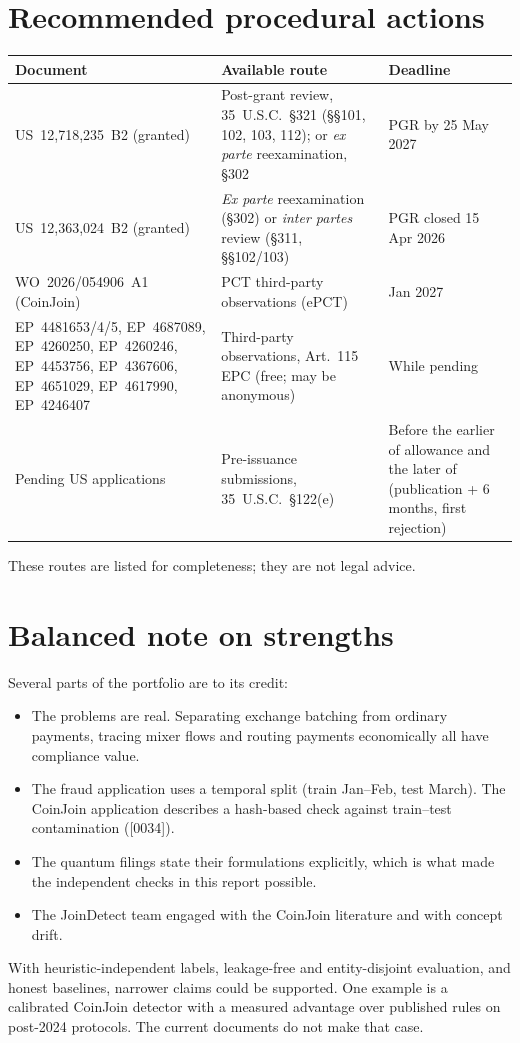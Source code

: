 \documentclass[10pt,a4paper]{article}
\begin{document}
\section{Recommended procedural actions}\label{sec:actions}
\begin{center}\small
\begin{tabularx}{\textwidth}{>{\raggedright\arraybackslash}p{4.2cm}>{\raggedright\arraybackslash}X>{\raggedright\arraybackslash}p{3.0cm}}
\toprule
Document & Available route & Deadline \\
\midrule
US~12,718,235~B2 (granted) & Post-grant review, 35~U.S.C.~\S321 (\S\S101, 102, 103, 112); or \emph{ex parte} reexamination, \S302 & PGR by 25 May 2027 \\
US~12,363,024~B2 (granted) & \emph{Ex parte} reexamination (\S302) or \emph{inter partes} review (\S311, \S\S102/103) & PGR closed 15 Apr 2026 \\
WO~2026/054906~A1 (CoinJoin) & PCT third-party observations (ePCT) & 4 Jan 2027 \\
EP~4481653/4/5, EP~4687089, EP~4260250, EP~4260246, EP~4453756, EP~4367606, EP~4651029, EP~4617990, EP~4246407 & Third-party observations, Art.~115 EPC (free; may be anonymous) & While pending \\
Pending US applications & Pre-issuance submissions, 35~U.S.C.~\S122(e) & Before the earlier of allowance and the later of (publication + 6 months, first rejection) \\
\bottomrule
\end{tabularx}
\end{center}
\noindent These routes are listed for completeness; they are not legal advice.

\section{Balanced note on strengths}
Several parts of the portfolio are to its credit:
\begin{itemize}
  \item The problems are real. Separating exchange batching from ordinary payments, tracing mixer flows and routing payments economically all have compliance value.
  \item The fraud application uses a temporal split (train Jan--Feb, test March). The CoinJoin application describes a hash-based check against train--test contamination ([0034]).
  \item The quantum filings state their formulations explicitly, which is what made the independent checks in this report possible.
  \item The JoinDetect team engaged with the CoinJoin literature and with concept drift.
\end{itemize}
With heuristic-independent labels, leakage-free and entity-disjoint evaluation, and honest baselines, narrower claims could be supported. One example is a calibrated CoinJoin detector with a measured advantage over published rules on post-2024 protocols. The current documents do not make that case.
\end{document}
